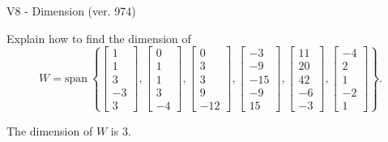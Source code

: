 \begin{exercise}
  \begin{exerciseTitle}V8 - Dimension (ver. 974)\end{exerciseTitle}
  \begin{exerciseStatement}
    Explain how to find the dimension of 
\[W=\mathrm{span}\ \left\{\left[\begin{array}{r}
1 \\
1 \\
3 \\
-3 \\
3
\end{array}\right] , \left[\begin{array}{r}
0 \\
1 \\
1 \\
3 \\
-4
\end{array}\right] , \left[\begin{array}{r}
0 \\
3 \\
3 \\
9 \\
-12
\end{array}\right] , \left[\begin{array}{r}
-3 \\
-9 \\
-15 \\
-9 \\
15
\end{array}\right] , \left[\begin{array}{r}
11 \\
20 \\
42 \\
-6 \\
-3
\end{array}\right] , \left[\begin{array}{r}
-4 \\
2 \\
1 \\
-2 \\
1
\end{array}\right]\right\}.\]



  \end{exerciseStatement}
  \begin{exerciseAnswer}
   The dimension of \(W\) is  \(3\).
  


  \end{exerciseAnswer}
\end{exercise}